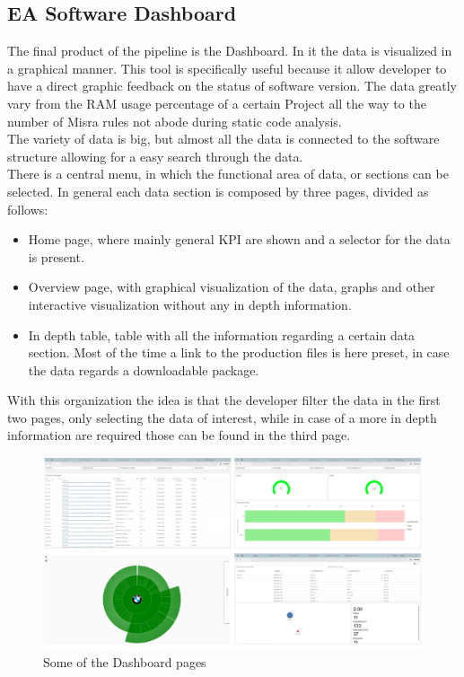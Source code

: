 \documentclass[../main.tex]{subfiles}
\begin{document}
\subsection{EA Software Dashboard}
The final product of the pipeline is the Dashboard. In it the data is visualized in a graphical manner. This tool is specifically useful because it allow developer to have a direct graphic feedback on the status of software version. The data greatly vary from the RAM usage percentage of a certain Project all the way to the number of Misra rules not abode during static code analysis.\\
The variety of data is big, but almost all the data is connected to the software structure allowing for a easy search through the data.\\
There is a central menu, in which the functional area of data, or sections can be selected. In general each data section is composed by three pages, divided as follows:
\begin{itemize}
    \item Home page, where mainly general \gls{KPI} are shown and a selector for the data is present.
    \item Overview page, with graphical visualization of the data, graphs and other interactive visualization without any in depth information.
    \item In depth table, table with all the information regarding a certain data section. Most of the time a link to the production files is here preset, in case the data regards a downloadable package. 
\end{itemize}
With this organization the idea is that the developer filter the data in the first two pages, only selecting the data of interest, while in case of a more in depth information are required those can be found in the third page.  
\begin{figure}[H]
    \centering
    \includegraphics[width=\linewidth]{images_folder/Dashboard.png}
    \caption{Some of the Dashboard pages}
    \label{fig:Dashboardseite}
\end{figure}
\cleardoublepage
\end{document}
